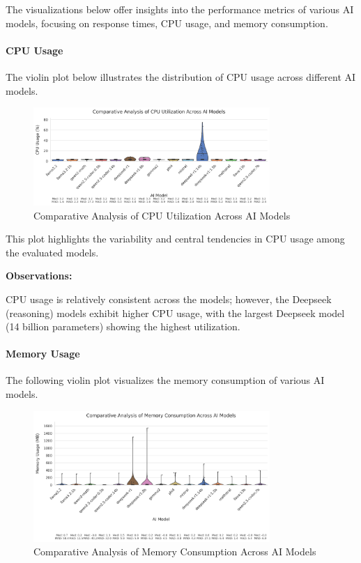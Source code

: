 The visualizations below offer insights into the performance metrics of various AI models, focusing on response times, CPU usage, and memory consumption.

\paragraph{CPU Usage}

The violin plot below illustrates the distribution of CPU usage across different AI models.

\begin{figure}[H]
  \centering
  \includegraphics[width=0.8\textwidth]{figures/scores/model_cpu_usage_comparison.png}
  \caption{Comparative Analysis of CPU Utilization Across AI Models}
  \label{fig:cpu_usage_comparison}
\end{figure}

This plot highlights the variability and central tendencies in CPU usage among the evaluated models.

\textbf{Observations:}

CPU usage is relatively consistent across the models; however, the Deepseek (reasoning) models exhibit higher CPU usage, with the largest Deepseek model (14 billion parameters) showing the highest utilization.

\paragraph{Memory Usage}

The following violin plot visualizes the memory consumption of various AI models.

\begin{figure}[H]
  \centering
  \includegraphics[width=0.8\textwidth]{figures/scores/model_memory_usage_comparison.png}
  \caption{Comparative Analysis of Memory Consumption Across AI Models}
  \label{fig:memory_usage_comparison}
\end{figure}


